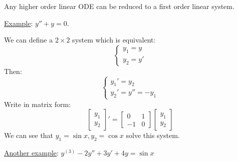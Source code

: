 \documentclass{article}
\begin{document}
Any higher order linear ODE can be reduced to a first order linear system.

{\underline{Example}}: $y'' + y = 0$.

We can define a $2 \times 2$ system which is equivalent:
\[ \left\{\begin{array}{l}
     y_1 = y\\
     y_2 = y'
   \end{array}\right. \]
Then:
\[ \left\{\begin{array}{l}
     y_1' = y_2\\
     y_2' = y'' = - y_1
   \end{array}\right. \]
Write in matrix form:
\[ \left[\begin{array}{c}
     y_1\\
     y_2
   \end{array}\right]' = \left[\begin{array}{cc}
     0 & 1\\
     - 1 & 0
   \end{array}\right]  \left[\begin{array}{c}
     y_1\\
     y_2
   \end{array}\right] \]
We can see that $y_1 = \sin x, y_2 = \cos x$ solve{} this system.

{\underline{Another example}}: $y^{(3)} - 2 y'' + 3 y' + 4 y = \sin x$
\end{document}
